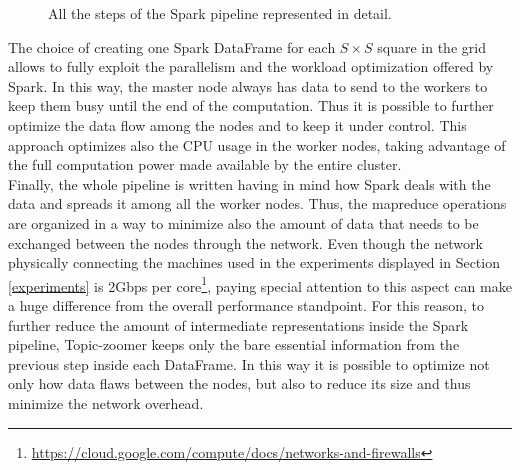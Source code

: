 \documentclass{sig-alternate-05-2015}
\begin{document}
\begin{figure}
  \caption{All the steps of the Spark pipeline represented in detail.}
  \label{spark_pipeline}
\end{figure}

The choice of creating one Spark DataFrame for each $S \times S$ square in the grid allows to fully exploit the parallelism and the workload optimization offered by Spark. In this way, the master node always has data to send to the workers to keep them busy until the end of the computation. Thus it is possible to further optimize the data flow among the nodes and to keep it under control. This approach optimizes also the CPU usage in the worker nodes, taking advantage of the full computation power made available by the entire cluster.\\
Finally, the whole pipeline is written having in mind how Spark deals with the data and spreads it among all the worker nodes. Thus, the map\-reduce operations are organized in a way to minimize also the amount of data that needs to be exchanged between the nodes through the network. Even though the network physically connecting the machines used in the experiments displayed in Section \ref{experiments} is 2Gbps per core\footnote{\url{https://cloud.google.com/compute/docs/networks-and-firewalls}}, paying special attention to this aspect can make a huge difference from the overall performance standpoint. For this reason, to further reduce the amount of intermediate representations inside the Spark pipeline, Topic-zoomer keeps only the bare essential information from the previous step inside each DataFrame. In this way it is possible to optimize not only how data flaws between the nodes, but also to reduce its size and thus minimize the network overhead.
\end{document}
